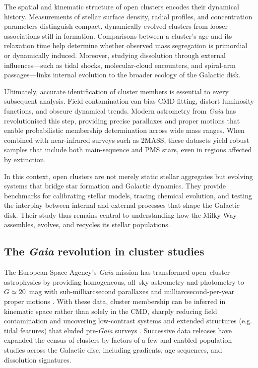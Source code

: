 \documentclass[../main.tex]{subfiles}
\begin{document}
The spatial and kinematic structure of open clusters encodes their dynamical history. Measurements of stellar surface density, radial profiles, and concentration parameters distinguish compact, dynamically evolved clusters from looser associations still in formation. Comparisons between a cluster’s age and its relaxation time help determine whether observed mass segregation is primordial or dynamically induced. Moreover, studying dissolution through external influences—such as tidal shocks, molecular-cloud encounters, and spiral-arm passages—links internal evolution to the broader ecology of the Galactic disk.

Ultimately, accurate identification of cluster members is essential to every subsequent analysis. Field contamination can bias CMD fitting, distort luminosity functions, and obscure dynamical trends. Modern astrometry from \textit{Gaia} has revolutionised this step, providing precise parallaxes and proper motions that enable probabilistic membership determination across wide mass ranges. When combined with near-infrared surveys such as 2MASS, these datasets yield robust samples that include both main-sequence and PMS stars, even in regions affected by extinction.

In this context, open clusters are not merely static stellar aggregates but evolving systems that bridge star formation and Galactic dynamics. They provide benchmarks for calibrating stellar models, tracing chemical evolution, and testing the interplay between internal and external processes that shape the Galactic disk. Their study thus remains central to understanding how the Milky Way assembles, evolves, and recycles its stellar populations.

\subsection{The \textit{Gaia} revolution in cluster studies}
The European Space Agency’s \textit{Gaia} mission has transformed open–cluster astrophysics by providing homogeneous, all–sky astrometry and photometry to $G\simeq20$~mag with sub-milliarcsecond parallaxes and milliarcsecond-per-year proper motions \citep{2016A&A...595A...1G,2023A&A...674A...1G}. With these data, cluster membership can be inferred in kinematic space rather than solely in the CMD, sharply reducing field contamination and uncovering low-contrast systems and extended structures (e.g. tidal features) that eluded pre-\textit{Gaia} surveys \citep[e.g.,][]{2020AA...640A...1C}. Successive data releases have expanded the census of clusters by factors of a few and enabled population studies across the Galactic disc, including gradients, age sequences, and dissolution signatures.
\end{document}
